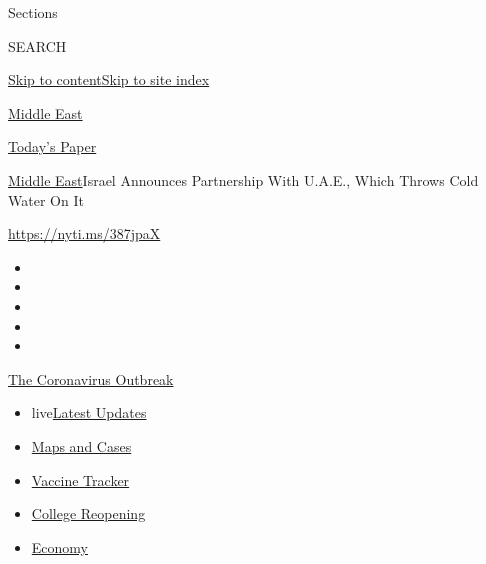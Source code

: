 Sections

SEARCH

\protect\hyperlink{site-content}{Skip to
content}\protect\hyperlink{site-index}{Skip to site index}

\href{https://www.nytimes3xbfgragh.onion/section/world/middleeast}{Middle
East}

\href{https://myaccount.nytimes3xbfgragh.onion/auth/login?response_type=cookie\&client_id=vi}{}

\href{https://www.nytimes3xbfgragh.onion/section/todayspaper}{Today's
Paper}

\href{/section/world/middleeast}{Middle East}\textbar{}Israel Announces
Partnership With U.A.E., Which Throws Cold Water On It

\url{https://nyti.ms/387jpaX}

\begin{itemize}
\item
\item
\item
\item
\item
\end{itemize}

\href{https://www.nytimes3xbfgragh.onion/news-event/coronavirus?action=click\&pgtype=Article\&state=default\&region=TOP_BANNER\&context=storylines_menu}{The
Coronavirus Outbreak}

\begin{itemize}
\tightlist
\item
  live\href{https://www.nytimes3xbfgragh.onion/2020/08/04/world/coronavirus-cases.html?action=click\&pgtype=Article\&state=default\&region=TOP_BANNER\&context=storylines_menu}{Latest
  Updates}
\item
  \href{https://www.nytimes3xbfgragh.onion/interactive/2020/us/coronavirus-us-cases.html?action=click\&pgtype=Article\&state=default\&region=TOP_BANNER\&context=storylines_menu}{Maps
  and Cases}
\item
  \href{https://www.nytimes3xbfgragh.onion/interactive/2020/science/coronavirus-vaccine-tracker.html?action=click\&pgtype=Article\&state=default\&region=TOP_BANNER\&context=storylines_menu}{Vaccine
  Tracker}
\item
  \href{https://www.nytimes3xbfgragh.onion/2020/08/02/us/covid-college-reopening.html?action=click\&pgtype=Article\&state=default\&region=TOP_BANNER\&context=storylines_menu}{College
  Reopening}
\item
  \href{https://www.nytimes3xbfgragh.onion/live/2020/08/04/business/stock-market-today-coronavirus?action=click\&pgtype=Article\&state=default\&region=TOP_BANNER\&context=storylines_menu}{Economy}
\end{itemize}


